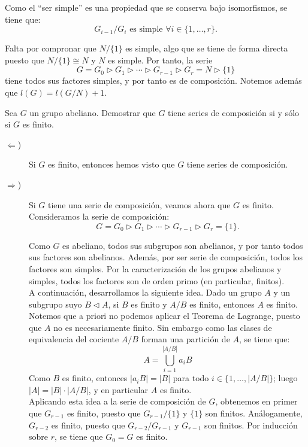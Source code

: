 \begin{ejercicio}
    Como el ``ser simple'' es una propiedad que se conserva bajo isomorfismos, se tiene que:
    \begin{equation*}
        G_{i-1}/G_i \text{ es simple } \forall i\in \{1,\ldots,r\}.
    \end{equation*}

    Falta por compronar que $N/\{1\}$ es simple, algo que se tiene de forma directa puesto que $N/\{1\}\cong N$ y $N$ es simple. Por tanto, la serie
    \[
        G = G_0 \rhd G_1 \rhd \cdots \rhd G_{r-1} \rhd G_r = N \rhd \{1\}
    \]
    tiene todos sus factores simples, y por tanto es de composición. Notemos además que $l(G)=l(G/N)+1$.    
\end{ejercicio}

\begin{ejercicio}
    Sea $G$ un grupo abeliano. Demostrar que $G$ tiene series de composición si y sólo si $G$ es finito.
    \begin{description}
        \item[$\Longleftarrow$)] Si $G$ es finito, entonces hemos visto que $G$ tiene series de composición.
        
        \item[$\Longrightarrow$)] Si $G$ tiene una serie de composición, veamos ahora que $G$ es finito. Consideramos la serie de composición:
        \[
            G = G_0 \rhd G_1 \rhd \cdots \rhd G_{r-1} \rhd G_r = \{1\}.
        \]

        Como $G$ es abeliano, todos sus subgrupos son abelianos, y por tanto todos sus factores son abelianos. Además, por ser serie de composición, todos los factores son simples. Por la caracterización de los grupos abelianos y simples, todos los factores son de orden primo (en particular, finitos).\\

        A continuación, desarrollamos la siguiente idea. Dado un grupo $A$ y un subgrupo suyo $B\lhd A$, si $B$ es finito y $A/B$ es finito, entonces $A$ es finito. Notemos que a priori no podemos aplicar el Teorema de Lagrange, puesto que $A$ no es necesariamente finito. Sin embargo como las clases de equivalencia del cociente $A/B$ forman una partición de $A$, se tiene que:
        \begin{equation*}
            A=\bigcup_{i=1}^{|A/B|} a_iB
        \end{equation*}
        Como $B$ es finito, entonces $|a_iB|=|B|$ para todo $i\in \{1,\ldots,|A/B|\}$; luego $|A|=|B|\cdot |A/B|$, y en particular $A$ es finito.\\

        Aplicando esta idea a la serie de composición de $G$, obtenemos en primer que $G_{r-1}$ es finito, puesto que $G_{r-1}/\{1\}$ y $\{1\}$ son finitos. Análogamente, $G_{r-2}$ es finito, puesto que $G_{r-2}/G_{r-1}$ y $G_{r-1}$ son finitos. Por inducción sobre $r$, se tiene que $G_{0}=G$ es finito.
    \end{description}
\end{ejercicio}


